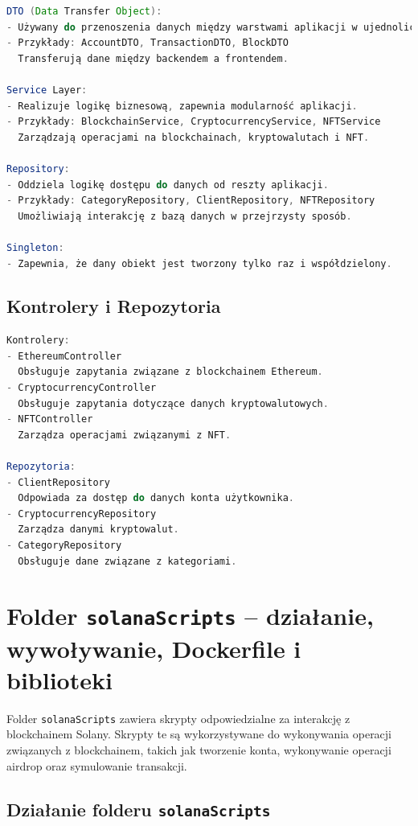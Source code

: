 \begin{lstlisting}[language=Java, caption={Wzorce projektowe w aplikacji}]
DTO (Data Transfer Object):
- Używany do przenoszenia danych między warstwami aplikacji w ujednoliconej formie.
- Przykłady: AccountDTO, TransactionDTO, BlockDTO
  Transferują dane między backendem a frontendem.

Service Layer:
- Realizuje logikę biznesową, zapewnia modularność aplikacji.
- Przykłady: BlockchainService, CryptocurrencyService, NFTService
  Zarządzają operacjami na blockchainach, kryptowalutach i NFT.

Repository:
- Oddziela logikę dostępu do danych od reszty aplikacji.
- Przykłady: CategoryRepository, ClientRepository, NFTRepository
  Umożliwiają interakcję z bazą danych w przejrzysty sposób.

Singleton:
- Zapewnia, że dany obiekt jest tworzony tylko raz i współdzielony.
\end{lstlisting}


\subsection{Kontrolery i Repozytoria}

\begin{lstlisting}[language=Java, caption={Kontrolery i Repozytoria w aplikacji}]
Kontrolery:
- EthereumController
  Obsługuje zapytania związane z blockchainem Ethereum.
- CryptocurrencyController
  Obsługuje zapytania dotyczące danych kryptowalutowych.
- NFTController
  Zarządza operacjami związanymi z NFT.

Repozytoria:
- ClientRepository
  Odpowiada za dostęp do danych konta użytkownika.
- CryptocurrencyRepository
  Zarządza danymi kryptowalut.
- CategoryRepository
  Obsługuje dane związane z kategoriami.
\end{lstlisting}

\section{Folder \texttt{solanaScripts} – działanie, wywoływanie, Dockerfile i biblioteki}

Folder \texttt{solanaScripts} zawiera skrypty odpowiedzialne za interakcję z blockchainem Solany. Skrypty te są wykorzystywane do wykonywania operacji związanych z blockchainem, takich jak tworzenie konta, wykonywanie operacji airdrop oraz symulowanie transakcji.

\subsection{Działanie folderu \texttt{solanaScripts}}

